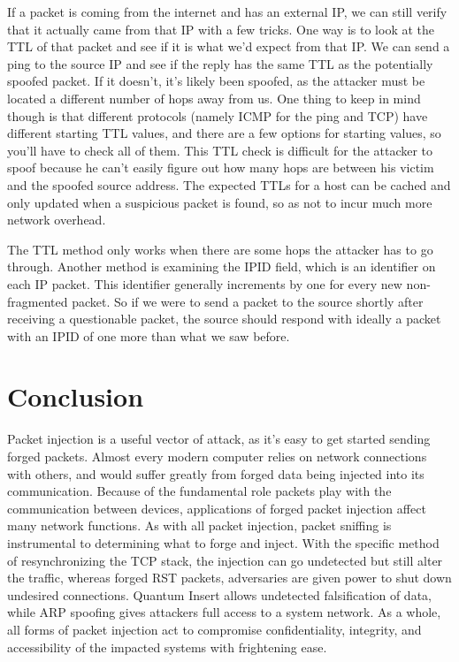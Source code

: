 \documentclass[journal]{IEEEtran}
\begin{document}
If a packet is coming from the internet and has an external IP, we can still verify that it actually came from that IP with a few tricks. One way is to look at the TTL of that packet and see if it is what we'd expect from that IP. We can send a ping to the source IP and see if the reply has the same TTL as the potentially spoofed packet. If it doesn't, it's likely been spoofed, as the attacker must be located a different number of hops away from us. One thing to keep in mind though is that different protocols (namely ICMP for the ping and TCP) have different starting TTL values, and there are a few options for starting values, so you'll have to check all of them. This TTL check is difficult for the attacker to spoof because he can't easily figure out how many hops are between his victim and the spoofed source address. The expected TTLs for a host can be cached and only updated when a suspicious packet is found, so as not to incur much more network overhead.

The TTL method only works when there are some hops the attacker has to go through. Another method is examining the IPID field, which is an identifier on each IP packet. This identifier generally increments by one for every new non-fragmented packet. So if we were to send a packet to the source shortly after receiving a questionable packet, the source should respond with ideally a packet with an IPID of one more than what we saw before. 

\section{Conclusion}

Packet injection is a useful vector of attack, as it's easy to get started sending forged packets. Almost every modern computer relies on network connections with others, and would suffer greatly from forged data being injected into its communication. Because of the fundamental role packets play with the communication between devices,  applications of forged packet injection affect many network functions. As with all packet injection, packet sniffing is instrumental to determining what to forge and inject.  With the specific method of resynchronizing the TCP stack, the injection can go undetected but still alter the traffic, whereas forged RST packets, adversaries are given power to shut down undesired connections. Quantum Insert allows undetected falsification of data, while ARP spoofing gives attackers full access to a system network. As a whole, all forms of packet injection act to compromise confidentiality, integrity, and accessibility of the impacted systems with frightening ease.
\end{document}
